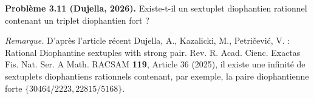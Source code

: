 \textbf{Problème 3.11 (Dujella, 2026).} Existe-t-il un sextuplet diophantien rationnel contenant un triplet diophantien fort ?

\medskip

\textit{Remarque.} D'après l'article récent Dujella, A., Kazalicki, M., Petričević, V. : Rational Diophantine sextuples with strong pair. Rev. R. Acad. Cienc. Exactas Fis. Nat. Ser. A Math. RACSAM \textbf{119}, Article 36 (2025), il existe une infinité de sextuplets diophantiens rationnels contenant, par exemple, la paire diophantienne forte $\{30464/2223, 22815/5168\}$.
